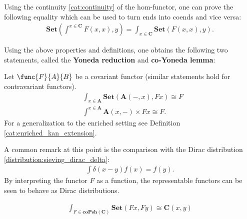     \begin{property}
        Using the continuity \ref{cat:continuity} of the hom-functor, one can prove the following equality which can be used to turn ends into coends and vice versa:
        \begin{gather}
            \mathbf{Set}\left(\int^{x\in\mathbf{C}}F(x,x),y\right) = \int_{x\in\mathbf{C}}\mathbf{Set}\left(F(x,x),y\right).
        \end{gather}
    \end{property}

    Using the above properties and definitions, one obtains the following two statements, called the \textbf{Yoneda reduction} and \textbf{co-Yoneda lemma}:
    \begin{property}\label{cat:ninja_yoneda}
        Let $\func{F}{A}{B}$ be a covariant functor (similar statements hold for contravariant functors).
        \begin{align}
            &\int_{x\in\mathbf{A}}\mathbf{Set}\left(\mathbf{A}(-,x),Fx\right)\cong F\\
            &\int^{x\in\mathbf{A}}\mathbf{A}(x,-)\times Fx\cong F.
        \end{align}
        For a generalization to the enriched setting see Definition \ref{cat:enriched_kan_extension}.
    \end{property}
    \begin{remark}
        A common remark at this point is the comparison with the Dirac distribution \eqref{distribution:sieving_dirac_delta}:
        \begin{gather}
            \int \delta(x-y)f(x) = f(y).
        \end{gather}
        By interpreting the functor $F$ as a function, the representable functors can be seen to behave as Dirac distributions.
    \end{remark}

    \begin{property}
        \begin{gather}
            \int_{F\in\mathbf{coPsh}(\mathbf{C})}\mathbf{Set}(Fx,Fy)\cong\mathbf{C}(x,y)
        \end{gather}
    \end{property}


